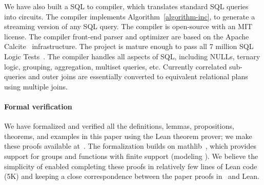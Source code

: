 We have also built a SQL to \dbsp compiler, which translates standard
SQL queries into \dbsp circuits.  The compiler implements
Algorithm~\ref{algorithm-inc}, to generate a streaming version of any
SQL query.  The compiler is open-source
 with
an MIT license.  The compiler front-end parser and optimizer are based
on the Apache Calcite~\cite{begoli-icmd18} infrastructure.  The
project is mature enough to pass all 7 million SQL Logic
Tests~\cite{sqllogictest}.  The compiler handles all aspects of SQL,
including NULLs, ternary logic, grouping, aggregation, multiset
queries, etc.  Currently correlated sub-queries and outer joins are
essentially converted to equivalent relational plans using multiple
joins.

\paragraph{Formal verification}

We have formalized and verified all the definitions, lemmas,
propositions, theorems, and examples in this paper using the Lean theorem prover; we make
these proofs available at~.
The formalization builds on mathlib~\cite{mathlib2020}, which provides
support for groups and functions with finite support (modeling
\zrs). We believe the simplicity of \dbsp enabled completing these
proofs in relatively few lines of Lean code (5K) and keeping a close
correspondence between the paper proofs in~\cite{tr} and Lean.
